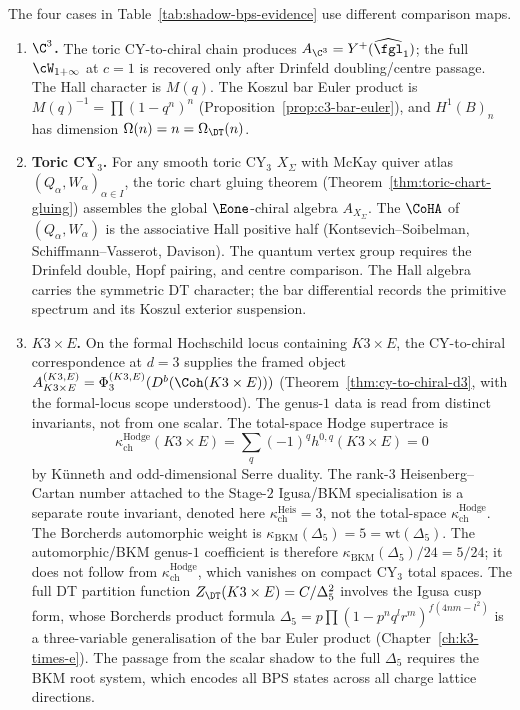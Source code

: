 \begin{remark}
\label{rem:shadow-bps-evidence-detail}
The four cases in Table~\ref{tab:shadow-bps-evidence} use different
comparison maps.

\begin{enumerate}[label=\textup{(\alph*)}]

\item \textbf{$\C^3$.}
The toric CY-to-chiral chain produces
\(A_{\C^3}=Y^+(\widehat{\fgl}_1)\); the full
\(\cW_{1+\infty}\) at \(c=1\) is recovered only after Drinfeld
doubling/centre passage. The Hall character is \(M(q)\). The Koszul
bar Euler product is \(M(q)^{-1}=\prod(1-q^n)^n\)
(Proposition~\ref{prop:c3-bar-euler}), and
\(H^1(B)_n\) has dimension \(\Omega(n)=n=\Omega_{\DT}(n)\).

\item \textbf{Toric CY$_3$.}
For any smooth toric CY$_3$ $X_\Sigma$ with McKay quiver atlas
$(Q_\alpha, W_\alpha)_{\alpha \in I}$, the toric chart gluing theorem
(Theorem~\ref{thm:toric-chart-gluing}) assembles the global
\(\Eone\)-chiral algebra \(A_{X_\Sigma}\). The \(\CoHA\) of
\((Q_\alpha,W_\alpha)\) is the associative Hall positive half
(Kontsevich--Soibelman, Schiffmann--Vasserot, Davison). The quantum
vertex group requires the Drinfeld double, Hopf pairing, and centre
comparison. The Hall algebra carries the symmetric
DT character; the bar differential records the primitive spectrum and
its Koszul exterior suspension.

\item \textbf{$K3 \times E$.}
On the formal Hochschild locus containing $K3\times E$, the CY-to-chiral
correspondence at $d=3$ supplies the framed object
$A_{K3 \times E}^{(K3,E)}
=\Phi_3^{(K3,E)}(D^b(\Coh(K3\times E)))$
(Theorem~\ref{thm:cy-to-chiral-d3}, with the formal-locus scope understood).
The genus-$1$ data is read from distinct invariants, not from one scalar.
The total-space Hodge supertrace is
\[
\kappa_{\mathrm{ch}}^{\mathrm{Hodge}}(K3\times E)
=\sum_q(-1)^q h^{0,q}(K3\times E)=0
\]
by K\"unneth and odd-dimensional Serre duality. The rank-$3$
Heisenberg--Cartan number attached to the Stage-$2$ Igusa/BKM
specialisation is a separate route invariant, denoted here
$\kappa_{\mathrm{ch}}^{\mathrm{Heis}}=3$, not the total-space
$\kappa_{\mathrm{ch}}^{\mathrm{Hodge}}$. The Borcherds automorphic weight is
$\kappa_{\mathrm{BKM}}(\Delta_5)=5=\mathrm{wt}(\Delta_5)$. The automorphic/BKM
genus-$1$ coefficient is therefore $\kappa_{\mathrm{BKM}}(\Delta_5)/24=5/24$; it
does not follow from $\kappa_{\mathrm{ch}}^{\mathrm{Hodge}}$, which vanishes on compact
CY$_3$ total spaces. The full DT partition function
$Z_{\DT}(K3 \times E)=C/\Delta_5^2$ involves the Igusa cusp form, whose
Borcherds product formula
$\Delta_5=p\prod(1-p^nq^lr^m)^{f(4nm-l^2)}$ is a three-variable
generalisation of the bar Euler product (Chapter~\ref{ch:k3-times-e}).
The passage from the scalar shadow to the full $\Delta_5$ requires the
BKM root system, which encodes all BPS states across all charge lattice
directions.


\end{enumerate}
\end{remark}
